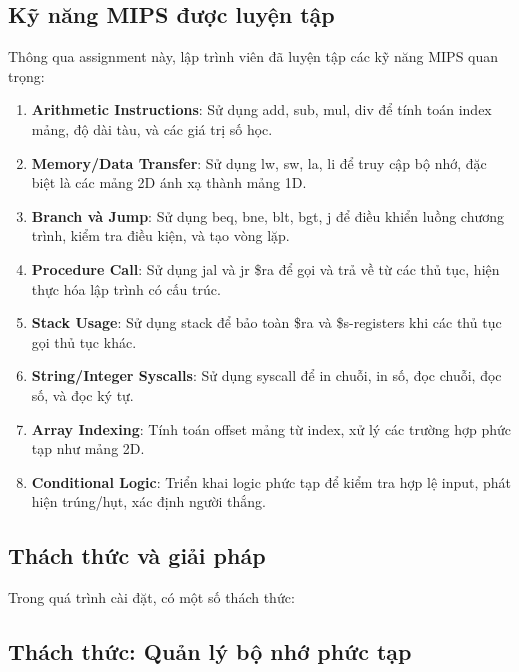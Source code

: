 \subsection{Kỹ năng MIPS được luyện tập}

Thông qua assignment này, lập trình viên đã luyện tập các kỹ năng MIPS quan trọng:

\begin{enumerate}
    \item \textbf{Arithmetic Instructions}: Sử dụng add, sub, mul, div để tính toán index mảng, độ dài tàu, và các giá trị số học.
    
    \item \textbf{Memory/Data Transfer}: Sử dụng lw, sw, la, li để truy cập bộ nhớ, đặc biệt là các mảng 2D ánh xạ thành mảng 1D.
    
    \item \textbf{Branch và Jump}: Sử dụng beq, bne, blt, bgt, j để điều khiển luồng chương trình, kiểm tra điều kiện, và tạo vòng lặp.
    
    \item \textbf{Procedure Call}: Sử dụng jal và jr \$ra để gọi và trả về từ các thủ tục, hiện thực hóa lập trình có cấu trúc.
    
    \item \textbf{Stack Usage}: Sử dụng stack để bảo toàn \$ra và \$s-registers khi các thủ tục gọi thủ tục khác.
    
    \item \textbf{String/Integer Syscalls}: Sử dụng syscall để in chuỗi, in số, đọc chuỗi, đọc số, và đọc ký tự.
    
    \item \textbf{Array Indexing}: Tính toán offset mảng từ index, xử lý các trường hợp phức tạp như mảng 2D.
    
    \item \textbf{Conditional Logic}: Triển khai logic phức tạp để kiểm tra hợp lệ input, phát hiện trúng/hụt, xác định người thắng.
\end{enumerate}

\subsection{Thách thức và giải pháp}

Trong quá trình cài đặt, có một số thách thức:

\subsection{Thách thức: Quản lý bộ nhớ phức tạp}

